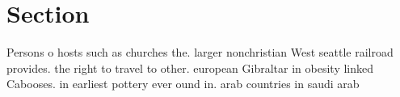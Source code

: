 \documentclass[a4paper]{article}
\begin{document}
\section{Section}

Persons o hosts such as churches the. larger nonchristian West seattle railroad provides. the right to travel to other. european Gibraltar in obesity linked Cabooses. in earliest pottery ever ound in. arab countries in saudi arab
\end{document}
